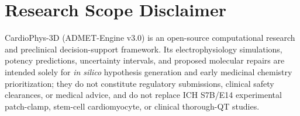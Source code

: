 \documentclass[10pt,twocolumn,letterpaper]{article}
\begin{document}
\section*{Research Scope Disclaimer}
CardioPhys-3D (ADMET-Engine v3.0) is an open-source computational research and preclinical decision-support framework. Its electrophysiology simulations, potency predictions, uncertainty intervals, and proposed molecular repairs are intended solely for \textit{in silico} hypothesis generation and early medicinal chemistry prioritization; they do not constitute regulatory submissions, clinical safety clearances, or medical advice, and do not replace ICH S7B/E14 experimental patch-clamp, stem-cell cardiomyocyte, or clinical thorough-QT studies.



\end{document}
